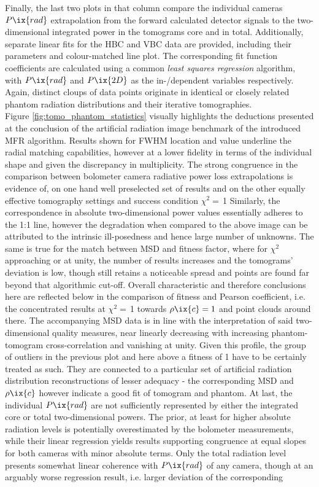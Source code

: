             Finally, the last two plots in that column compare the individual cameras $P\ix{rad}$ extrapolation from the forward calculated detector signals to the two-dimensional integrated power in the tomograms core and in total. Additionally, separate linear fits for the HBC and VBC data are provided, including their parameters and colour-matched line plot. The corresponding fit function coefficients are calculated using a common \textit{least squares regression} algorithm, with $P\ix{rad}$ and $P\ix{2D}$ as the in-/dependent variables respectively. Again, distinct cloups of data points originate in identical or closely related phantom radiation distributions and their iterative tomographies.\\%
            Figure \ref{fig:tomo_phantom_statistics} visually highlights the deductions presented at the conclusion of the artificial radiation image benchmark of the introduced MFR algorithm. Results shown for FWHM location and value underline the radial matching capabilities, however at a lower fidelity in terms of the individual shape and given the discrepancy in multiplicity. The strong congruence in the comparison between bolometer camera radiative power loss extrapolations is evidence of, on one hand well preselected set of results and on the other equally effective tomography settings and success condition $\chi^{2}=$\,\SI{1}{\arbitraryunit} Similarly, the correspondence in absolute two-dimensional power values essentially adheres to the 1:1 line, however the degradation when compared to the above image can be attributed to the intrinsic ill-posedness and hence large number of unknowns. The same is true for the match between MSD and fitness factor, where for $\chi^{2}$ approaching or at unity, the number of results increases and the tomograms' deviation is low, though still retains a noticeable spread and points are found far beyond that algorithmic cut-off. Overall characteristic and therefore conclusions here are reflected below in the comparison of fitness and Pearson coefficient, i.e. the concentrated results at $\chi^{2}=$\,\SI{1}{\arbitraryunit} towards $\rho\ix{c}=1$ and point clouds around there. The accompanying MSD data is in line with the interpretation of said two-dimensional quality measures, near linearly decreasing with increasing phantom-tomogram cross-correlation and vanishing at unity. Given this profile, the group of outliers in the previous plot and here above a fitness of \SI{1}{\arbitraryunit} have to be certainly treated as such. They are connected to a particular set of artificial radiation distribution reconstructions of lesser adequacy - the corresponding MSD and $\rho\ix{c}$ however indicate a good fit of tomogram and phantom. At last, the individual $P\ix{rad}$ are not sufficiently represented by either the integrated core or total two-dimensional powers. The prior, at least for higher absolute radiation levels is potentially overestimated by the bolometer measurements, while their linear regression yields results supporting congruence at equal slopes for both cameras with minor absolute terms. Only the total radiation level presents somewhat linear coherence with $P\ix{rad}$ of any camera, though at an arguably worse regression result, i.e. larger deviation of the corresponding 